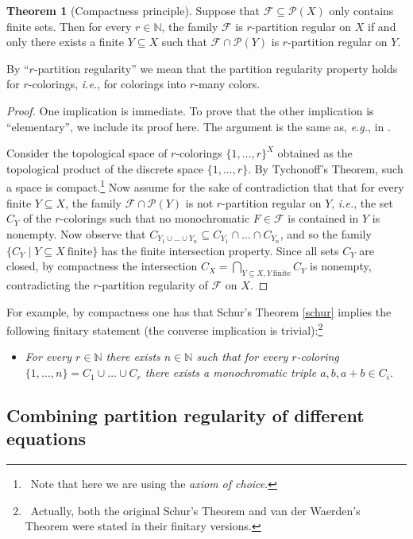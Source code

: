 \documentclass[a4paper,oneside]{article}
\newcommand{\N}{\mathbb{N}}
\newcommand{\PP}{\mathcal{P}}
\newcommand{\F}{\mathcal{F}}
\theoremstyle{definition}
\newtheorem{theorem}{Theorem}[section]
\theoremstyle{named}
\begin{document}
\begin{theorem}[Compactness principle]\label{compactness}
Suppose that $\F\subseteq\PP(X)$ only contains finite sets.
Then for every $r\in\N$,
the family $\F$ is $r$-partition regular on $X$ if and only 
there exists a finite $Y\subseteq X$
such that $\F\cap\PP(Y)$ is $r$-partition regular on $Y$.
\end{theorem}

By ``$r$-partition regularity'' we mean that the partition regularity property
holds for $r$-colorings, \emph{i.e.}, for colorings into $r$-many colors.

\begin{proof} One implication is immediate. To prove that the other implication is ``elementary'', we include its proof here. The argument is the same as, \emph{e.g.},
in \cite[\S 1.5]{grs}. 

Consider the topological space of $r$-colorings $\{1,\dots,r\}^X$ 
obtained as the topological product of the discrete space $\{1,\ldots,r\}$.
By Tychonoff's Theorem, such a space is compact.\footnote
{~Note that here we are using the \emph{axiom of choice}.}
Now assume for the sake of contradiction that
that for every finite $Y\subseteq X$, the family $\F\cap\PP(Y)$ is 
not $r$-partition regular on $Y$, \emph{i.e.},
the set $C_Y$ of the $r$-colorings 
such that no monochromatic $F\in\F$ is contained in $Y$ is nonempty. 
Now observe that $C_{Y_1\cup\ldots\cup Y_n}\subseteq C_{Y_1}\cap\ldots\cap C_{Y_n}$,
and so the family $\{C_Y\mid Y\subseteq X\ \text{finite}\}$ has the finite intersection property.
Since all sets $C_Y$ are closed, by compactness
the intersection $C_{X}=\bigcap_{Y\subseteq X, Y \ \text{finite}} C_{Y}$
is nonempty, contradicting the $r$-partition regularity of $\F$ on $X$.
\end{proof}

For example, by compactness one has that 
Schur's Theorem \ref{schur} implies the following finitary statement 
(the converse implication is trivial):\footnote
{~Actually, both the original Schur's Theorem \cite{sh}
and van der Waerden's Theorem were stated in their finitary versions.}
\begin{itemize}
\item
\emph{For every $r\in\N$ there exists $n\in\N$ such that for every
$r$-coloring $\{1,\ldots,n\}=C_1\cup\ldots\cup C_r$ there exists
a monochromatic triple $a,b,a+b\in C_i$.}
\end{itemize}

\subsection{Combining partition regularity of different equations}
\end{document}
